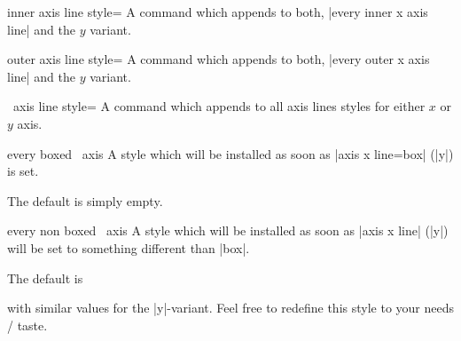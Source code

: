 \begin{pgfplotskey}{inner axis line style=}
	A command which appends  to both, |every inner x axis line| and the $y$ variant.
\end{pgfplotskey}
\begin{pgfplotskey}{outer axis line style=}
	A command which appends  to both, |every outer x axis line| and the $y$ variant.
\end{pgfplotskey}
\begin{pgfplotsxykey}{\x\ axis line style=}
	A command which appends  to all axis lines styles for either $x$ or $y$ axis.
\end{pgfplotsxykey}

\begin{pgfplotsxykey}{every boxed \x\ axis}
	A style which will be installed as soon as |axis x line=box| (|y|) is set.

	The default is simply empty.
\end{pgfplotsxykey}
\begin{pgfplotsxykey}{every non boxed \x\ axis}
	A style which will be installed as soon as |axis x line| (|y|) will be set to something different than |box|. 
	
	The default is 
\begin{codeexample}
\end{codeexample}
	\noindent with similar values for the |y|-variant. Feel free to redefine this style to your needs / taste.
\end{pgfplotsxykey}

